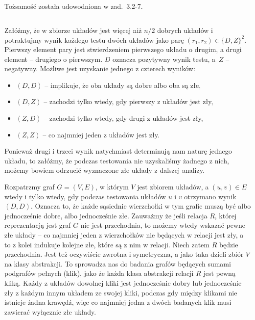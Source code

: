 \subsubsection{} %
Tożsamość została udowodniona w zad.~3.2-7.

\subsection{} %

\subsubsection{} %
Załóżmy, że w zbiorze układów jest więcej niż $n/2$ dobrych układów i potraktujmy wynik każdego testu dwóch układów jako parę $(r_1,r_2)\in\{D,Z\}^2$. Pierwszy element pary jest stwierdzeniem pierwszego układu o drugim, a drugi element -- drugiego o pierwszym. $D$ oznacza pozytywny wynik testu, a~$Z$ -- negatywny. Możliwe jest uzyskanie jednego z czterech wyników:
\begin{itemize}
	\item $(D,D)$ -- implikuje, że oba układy są dobre albo oba są złe,
	\item $(D,Z)$ -- zachodzi tylko wtedy, gdy pierwszy z układów jest zły,
	\item $(Z,D)$ -- zachodzi tylko wtedy, gdy drugi z układów jest zły,
	\item $(Z,Z)$ -- co najmniej jeden z układów jest zły.
\end{itemize}
Ponieważ drugi i trzeci wynik natychmiast determinują nam naturę jednego układu, to załóżmy, że podczas testowania nie uzyskaliśmy żadnego z nich, możemy bowiem odrzucić wyznaczone złe układy z dalszej analizy.

Rozpatrzmy graf $G=(V,E)$, w którym $V$ jest zbiorem układów, a $(u,v)\in E$ wtedy i tylko wtedy, gdy podczas testowania układów $u$ i $v$ otrzymano wynik $(D,D)$. Oznacza to, że każde sąsiednie wierzchołki w tym grafie muszą być albo jednocześnie dobre, albo jednocześnie złe. Zauważmy że jeśli relacja $R$, której reprezentacją jest graf $G$ nie jest przechodnia, to możemy wtedy wskazać pewne złe układy -- co najmniej jeden z wierzchołków nie będących w relacji jest zły, a to z kolei indukuje kolejne złe, które są z nim w relacji. Niech zatem $R$ będzie przechodnia. Jest też oczywiście zwrotna i symetryczna, a jako taka dzieli zbiór $V$ na klasy abstrakcji. To sprowadza nas do badania grafów będących sumami podgrafów pełnych (klik), jako że każda klasa abstrakcji relacji $R$ jest pewną kliką. Każdy z układów dowolnej kliki jest jednocześnie dobry lub jednocześnie zły z każdym innym układem ze swojej kliki, podczas gdy między klikami nie istnieje żadna krawędź, więc co najmniej jedna z dwóch badanych klik musi zawierać wyłącznie złe układy.

